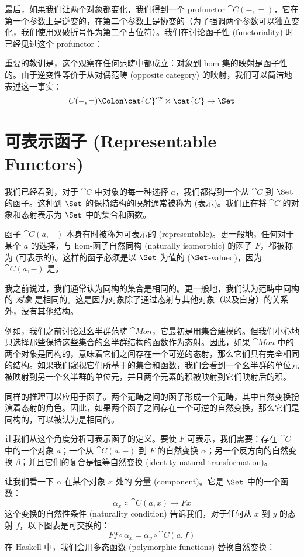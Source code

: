 最后，如果我们让两个对象都变化，我们得到一个 pro\-functor $\cat{C}(-, =)$，它在第一个参数上是逆变的，在第二个参数上是协变的（为了强调两个参数可以独立变化，我们使用双破折号作为第二个占位符）。我们在讨论函子性 (functoriality) 时已经见过这个 profunctor：

重要的教训是，这个观察在任何范畴中都成立：对象到 hom-集的映射是函子性的。由于逆变性等价于从对偶范畴 (opposite category) 的映射，我们可以简洁地表述这一事实：
\[C(-, =) \Colon \cat{C}^\mathit{op} \times \cat{C} \to \Set\]

\section{可表示函子 (Representable Functors)}

我们已经看到，对于 $\cat{C}$ 中对象的每一种选择 $a$，我们都得到一个从 $\cat{C}$ 到 $\Set$ 的函子。这种到 $\Set$ 的保持结构的映射通常被称为  (表示)。我们正在将 $\cat{C}$ 的对象和态射表示为 $\Set$ 中的集合和函数。

函子 $\cat{C}(a, -)$ 本身有时被称为可表示的 (representable)。更一般地，任何对于某个 $a$ 的选择，与 hom-函子自然同构 (naturally isomorphic) 的函子 $F$，都被称为  (可表示的)。这样的函子必须是以 $\Set$ 为值的 ($\Set$-valued)，因为 $\cat{C}(a, -)$ 是。

我之前说过，我们通常认为同构的集合是相同的。更一般地，我们认为范畴中同构的 \emph{对象} 是相同的。这是因为对象除了通过态射与其他对象（以及自身）的关系外，没有其他结构。

例如，我们之前讨论过幺半群范畴 $\cat{Mon}$，它最初是用集合建模的。但我们小心地只选择那些保持这些集合的幺半群结构的函数作为态射。因此，如果 $\cat{Mon}$ 中的两个对象是同构的，意味着它们之间存在一个可逆的态射，那么它们具有完全相同的结构。如果我们窥视它们所基于的集合和函数，我们会看到一个幺半群的单位元被映射到另一个幺半群的单位元，并且两个元素的积被映射到它们映射后的积。

同样的推理可以应用于函子。两个范畴之间的函子形成一个范畴，其中自然变换扮演着态射的角色。因此，如果两个函子之间存在一个可逆的自然变换，那么它们是同构的，可以被认为是相同的。

让我们从这个角度分析可表示函子的定义。要使 $F$ 可表示，我们需要：存在 $\cat{C}$ 中的一个对象 $a$；一个从 $\cat{C}(a, -)$ 到 $F$ 的自然变换 $\alpha$；另一个反方向的自然变换 $\beta$；并且它们的复合是恒等自然变换 (identity natural transformation)。

让我们看一下 $\alpha$ 在某个对象 $x$ 处的 分量 (component)。它是 $\Set$ 中的一个函数：
\[\alpha_x \Colon \cat{C}(a, x) \to F x\]
这个变换的自然性条件 (naturality condition) 告诉我们，对于任何从 $x$ 到 $y$ 的态射 $f$，以下图表是可交换的：
\[F f \circ \alpha_x = \alpha_y \circ \cat{C}(a, f)\]
在 Haskell 中，我们会用多态函数 (polymorphic functions) 替换自然变换：

